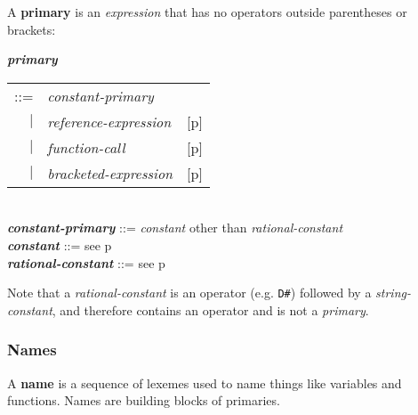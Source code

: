 \documentclass[12pt]{article}
\newcommand{\key}[1]{{\rm \bfseries #1}}
\newcommand{\emkey}[1]{{\em \bfseries #1}}
\newcommand{\pagref}[1]{p\pageref{#1}}
\newenvironment{indpar}[1][0.3in]%
	{\begin{list}{}%
		     {\setlength{\itemsep}{0in}%
		      \setlength{\topsep}{0in}%
		      \setlength{\parsep}{1ex}%
		      \setlength{\labelwidth}{#1}%
		      \setlength{\leftmargin}{#1}%
		      \addtolength{\leftmargin}{\labelsep}}%
	 \item}%
	{\end{list}}
\begin{document}
A \key{primary} is an {\em expression} that has no operators outside
parentheses or brackets:
\begin{indpar}
\emkey{primary}
    \begin{tabular}[t]{@{}rll}
    ::= & {\em constant-primary} \\
    $|$ & {\em reference-expression}    & [\pagref{REFERENCE-EXPRESSIONS}] \\
    $|$ & {\em function-call}		& [\pagref{FUNCTION-CALLS}] \\
    $|$ & {\em bracketed-expression}	& [\pagref{BRACKETED-EXPRESSIONS}] \\
    \end{tabular}
\\[0.5ex]
\emkey{constant-primary} ::= {\em constant} other than {\em rational-constant}
\\[0.5ex]
\emkey{constant} ::= see \pagref{CONSTANTS}
\\[0.5ex]
\emkey{rational-constant} ::= see \pagref{RATIONAL-CONSTANTS}

\end{indpar}

Note that a {\em rational-constant} is an operator (e.g. {\tt D\#})
followed by a {\em string-constant}, and therefore contains an operator
and is not a {\em primary}.

\subsubsection{Names}
\label{NAMES}

A \key{name} is a sequence of lexemes used to name things like
variables and functions.  Names are building blocks of primaries.
\end{document}
